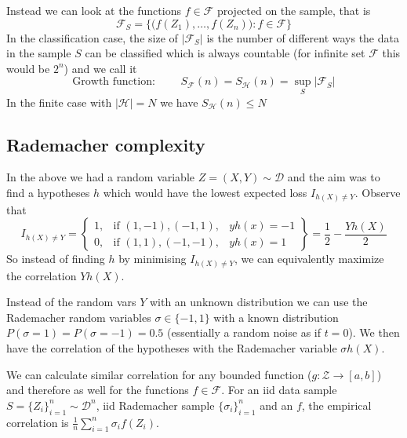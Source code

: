 Instead we can look at the functions $f \in \mathcal{F}$ projected on the sample, that is 
\begin{equation}
\mathcal{F}_S = \{ \big( f(Z_1), \ldots, f(Z_n) \big) : f \in \mathcal{F} \}
\end{equation}
In the classification case, the size of $|\mathcal{F}_S|$ is the number of different ways the data in the sample $S$ can be classified which is always countable (for infinite set $\mathcal{F}$ this would be $2^n$) and we call it
\begin{equation}
\text{Growth function: } \qquad S_\mathcal{F}(n) = S_\mathcal{H}(n) = \sup_S |\mathcal{F}_S|
\end{equation}
In the finite case with $|\mathcal{H}| = N$ we have $S_\mathcal{H}(n) \leq N$

\subsection{Rademacher complexity}
In the above we had a random variable $Z = (X,Y) \sim \mathcal{D}$ and the aim was to find a hypotheses $h$ which would have the lowest expected loss $I_{h(X) \neq Y}$.
Observe that
\begin{equation}
I_{h(X) \neq Y} =
\left\{
\begin{array}{lll}
        1, & \text{if } (1,-1), (-1,1), & y h(x) = -1 \\
        0, & \text{if } (1,1), (-1,-1), & y h(x) = 1 	
\end{array}
\right\} = \frac{1}{2} - \frac{Y h(X)}{2}
\end{equation}
So instead of finding $h$ by minimising $I_{h(X) \neq Y}$, we can equivalently maximize the correlation $Y h(X)$.

Instead of the random vars $Y$ with an unknown distribution we can use the Rademacher random variables $\sigma \in \{-1,1\}$ with a known distribution $P(\sigma = 1) = P(\sigma = -1) = 0.5$ (essentially a random noise as if $t=0$).
We then have the correlation of the hypotheses with the Rademacher variable $\sigma h(X)$.

We can calculate similar correlation for any bounded function ($g: \mathcal{Z} \to [a,b]$) and therefore as well for the functions $f \in \mathcal{F}$.
For an iid data sample $S = \{ Z_i\}_{i=1}^n \sim \mathcal{D}^n$, iid Rademacher sample $\{ \sigma_i\}_{i=1}^n$ and an $f$, the empirical correlation is $\frac{1}{n} \sum_{i=1}^{n} \sigma_i f(Z_i)$.

